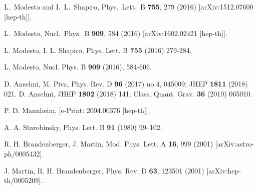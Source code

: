 \documentclass[a4paper,11pt]{article}
\begin{document}
\begin{thebibliography}{99}


L.~Modesto and I.~L.~Shapiro,
Phys.\ Lett.\ B {\bf 755}, 279 (2016)
[arXiv:1512.07600 [hep-th]].

L.~Modesto,
Nucl.\ Phys.\ B {\bf 909}, 584 (2016)
[arXiv:1602.02421 [hep-th]].














  L. Modesto, I. L. Shapiro, Phys. Lett. B {\bf 755} (2016) 279-284. 

  L. Modesto, Nucl. Phys. B {\bf 909} (2016),  584-606.








D. Anselmi, M. Piva, Phys. Rev. D {\bf 96} (2017) no.4, 045009; JHEP {\bf 1811} (2018) 021. D. Anselmi, JHEP {\bf 1802} (2018) 141; Class. Quant. Grav. {\bf 36} (2019) 065010.





 P. D. Mannheim, [e-Print: 2004.00376 [hep-th]].



A. A. Starobinsky,  Phys. Lett. B {\bf 91} (1980) 99–102.






R. H. Brandenberger, J. Martin, Mod. Phys. Lett. A {\bf 16}, 999 (2001) [arXiv:astro-ph/0005432]. 

 J. Martin, R. H. Brandenberger, Phys. Rev. D {\bf 63}, 123501 (2001) [arXiv:hep-th/0005209].  


\end{thebibliography}
\end{document}
